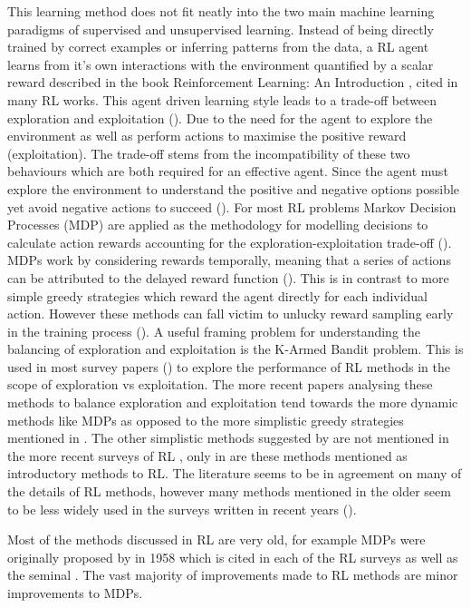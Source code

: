 \documentclass[10pt,journal]{IEEEtran}
\begin{document}
This learning method does not fit neatly into the two main machine learning paradigms of supervised and unsupervised learning. Instead of being directly trained by correct examples or inferring patterns from the data, a RL agent learns from it's own interactions with the environment quantified by a scalar reward described in the book Reinforcement Learning: An Introduction \cite{Sutton}, cited in many RL works. This agent driven learning style leads to a trade-off between exploration and exploitation (\cite{Sutton, Kaelbling, Busoniu, Kober}). Due to the need for the agent to explore the environment as well as perform actions to maximise the positive reward (exploitation). The trade-off stems from the incompatibility of these two behaviours which are both required for an effective agent. Since the agent must explore the environment to understand the positive and negative options possible yet avoid negative actions to succeed (\cite{Kaelbling}). For most RL problems Markov Decision Processes (MDP) are applied as the methodology for modelling decisions to calculate action rewards accounting for the exploration-exploitation trade-off (\cite{Kober}). MDPs work by considering rewards temporally, meaning that a series of actions can be attributed to the delayed reward function (\cite{Kaelbling, Busoniu, Kober}). This is in contrast to more simple greedy strategies which reward the agent directly for each individual action. However these methods can fall victim to unlucky reward sampling early in the training process (\cite{Kaelbling}). A useful framing problem for understanding the balancing of exploration and exploitation is the K-Armed Bandit problem. This is used in most survey papers (\cite{Kaelbling, Busoniu, Kober}) to explore the performance of RL methods in the scope of exploration vs exploitation. The more recent papers \cite{Busoniu, Kober} analysing these methods to balance exploration and exploitation tend towards the more dynamic methods like MDPs as opposed to the more simplistic greedy strategies mentioned in \cite{Kaelbling}. The other simplistic methods suggested by \cite{Kaelbling} are not mentioned in the more recent surveys of RL \cite{Busoniu, Kober}, only in \cite{Sutton} are these methods mentioned as introductory methods to RL. The literature seems to be in agreement on many of the details of RL methods, however many methods mentioned in the older \cite{Kaelbling} seem to be less widely used in the surveys written in recent years (\cite{Busoniu, Kober}).

Most of the methods discussed in RL are very old, for example MDPs were originally proposed by \cite{Bellman} in 1958 which is cited in each of the RL surveys \cite{Kaelbling, Busoniu, Kober} as well as the seminal \cite{Sutton}. The vast majority of improvements made to RL methods are minor improvements to MDPs.
\end{document}
